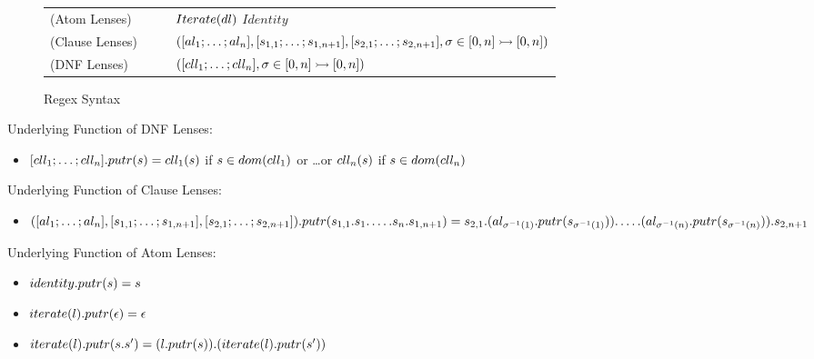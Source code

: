\documentclass{article}
\begin{document}
\begin{figure}
\begin{tabular}{l@{\ }l@{\ }c@{\ }l}

(Atom Lenses) &\AtomLens{} & \GEq{} & $Iterate(dl)$ \GBar{} $Identity$ \\
(Clause Lenses) &\ClauseLens{} & \GEq{} & $([al_1 ; \ldots ; al_n], [s_{1,1} ; \ldots ; s_{1,n+1}], [s_{2,1} ; \ldots ; s_{2,n+1}], \sigma \in [0,n] \rightarrowtail [0,n])$ \\
(DNF Lenses)& \DNFLens{} & \GEq{} & $([cll_1 ; \ldots ; cll_n], \sigma \in [0,n] \rightarrowtail [0,n])$ \\
\end{tabular}
\caption{Regex Syntax}
\label{fig:refn-subgrammars}
\end{figure}


Underlying Function of DNF Lenses:
\begin{itemize}
\item $[cll_1 ; \ldots ; cll_n].putr(s) = cll_1(s)$ if $s \in dom(cll_1)$ or \ldots or $cll_n(s)$ if $s \in dom(cll_n)$
\end{itemize}

Underlying Function of Clause Lenses:
\begin{itemize}
\item $([al_1; \ldots; al_n],[s_{1,1}; \ldots; s_{1,n+1}],[s_{2,1}; \ldots; s_{2,n+1}]).putr(s_{1,1}.s_1. \ldots .s_n.s_{1,n+1}) = s_{2,1}.(al_{\sigma^{-1}(1)}.putr(s_{\sigma^{-1}(1)})). \ldots . (al_{\sigma^{-1}(n)}.putr(s_{\sigma^{-1}(n)})).s_{2,n+1}$
\end{itemize}

Underlying Function of Atom Lenses:
\begin{itemize}
\item $identity.putr(s)=s$
\item $iterate(l).putr(\epsilon) = \epsilon$
\item $iterate(l).putr(s . s') = (l.putr(s)) . (iterate(l).putr(s'))$
\end{itemize}
\end{document}
